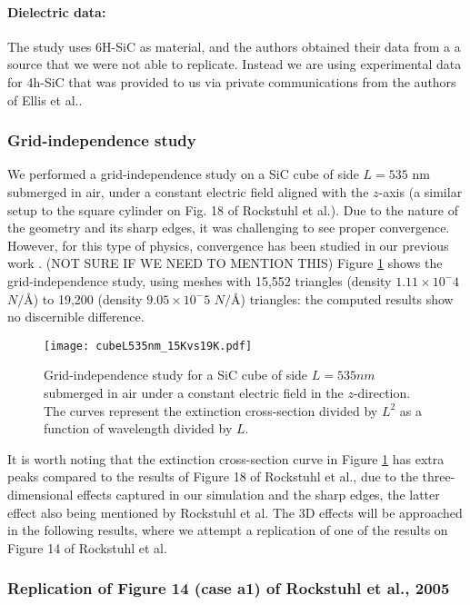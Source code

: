 \paragraph{Dielectric data:} The study uses 6H-SiC as material, and the authors obtained their data from a a source that we
were not able to replicate. Instead we are using experimental data for 4h-SiC that was provided to us 
via private communications from the authors of Ellis et al.\cite{ellis2016}.  

\subsubsection{Grid-independence study}

We performed a grid-independence study on a SiC cube of side $L=535$ nm submerged in air, under a 
constant electric field aligned with the $z$-axis (a similar setup to the square cylinder on Fig. 18 of 
Rockstuhl et al.\cite{rockstuhl2005}). 
Due to the nature of the geometry and its sharp edges, it was challenging to see proper convergence. However,
for this type of physics, convergence has been studied in our previous work \cite{ClementiETal2019}. (NOT SURE IF WE NEED TO MENTION THIS)
Figure \ref{fig:cube535} shows the grid-independence study, using meshes with  15,552 
triangles (density $1.11\times10^-4$ $N/\text{\AA}$) to 19,200 (density $9.05\times10^-5$ $N/\text{\AA}$) 
triangles: the computed results show no discernible difference.

\begin{figure}
    \centering
    \texttt{[image: cubeL535nm\_15Kvs19K.pdf]} 
    \caption{Grid-independence study for a SiC cube of side $L=535 nm$ submerged in air under a constant 
    electric field in the $z$-direction. The curves represent the extinction cross-section divided by $L^2$ 
    as a function of wavelength divided by $L$.}
    \label{fig:cube535}
 \end{figure}

It is worth noting that the extinction cross-section curve in Figure \ref{fig:cube535} has extra peaks 
compared to the results of Figure 18 of Rockstuhl et al., due to the three-dimensional effects captured in our simulation and the sharp 
edges, the latter effect also being mentioned by Rockstuhl et al. The 3D effects will be approached
in the following results, where we attempt a replication of one of the results on Figure 14 of Rockstuhl et al. 

\subsubsection{Replication of Figure 14 (case a1) of Rockstuhl et al., 2005}

